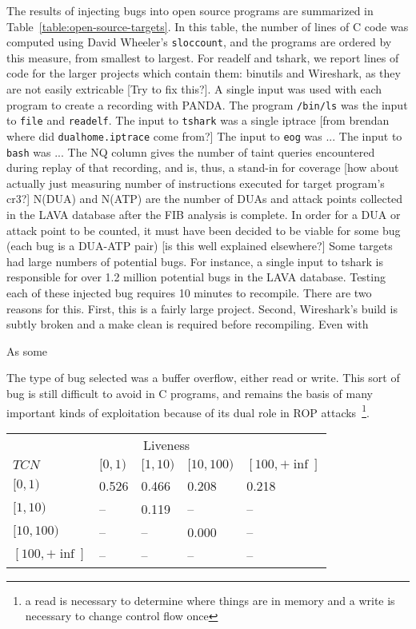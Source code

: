 The results of injecting bugs into open source programs are summarized in Table~\ref{table:open-source-targets}.
In this table, the number of lines of C code was computed using David Wheeler's \verb+sloccount+, and the programs are ordered by this measure, from smallest to largest.
For readelf and tshark, we report lines of code for the larger projects which contain them: binutils and Wireshark, as they are not easily extricable [Try to fix this?].
A single input was used with each program to create a recording with PANDA.
The program \verb+/bin/ls+ was the input to \verb+file+ and \verb+readelf+.
The input to \verb+tshark+ was a single iptrace [from brendan where did \verb+dualhome.iptrace+ come from?] 
The input to \verb+eog+ was ...
The input to \verb+bash+ was ...
The NQ column gives the number of taint queries encountered during replay of that recording, and is, thus, a stand-in for coverage [how about actually just measuring number of instructions executed for target program's cr3?]
N(DUA) and N(ATP) are the number of DUAs and attack points collected in the LAVA database after the FIB analysis is complete.
In order for a DUA or attack point to be counted, it must have been decided to be viable for some bug (each bug is a DUA-ATP pair) [is this well explained elsewhere?]
Some targets had large numbers of potential bugs. 
For instance, a single input to tshark is responsible for over 1.2 million potential bugs in the LAVA database. 
Testing each of these injected bug requires 10 minutes to recompile.  
There are two reasons for this.
First, this is a fairly large project.  
Second, Wireshark's build is subtly broken and a make clean is required before recompiling.  
Even with 


As some 

The type of bug selected was a buffer overflow, either read or write.
This sort of bug is still difficult to avoid in C programs, and remains the basis of many important kinds of exploitation because of its dual role in ROP attacks~\footnote{a read is necessary to determine where things are in memory and a write is necessary to change control flow once}.


\begin{table}
\centering
\begin{tabular}{l|l|l|l|l} 
 & \multicolumn{3}{c}{Liveness} &  \\  
$TCN$ &         $[0,1)$ & $[1,10)$ & $[10,100)$ & $[100,+\inf]$ \\  \hline 
$[0,1)$ &       0.526   & 0.466    & 0.208      & 0.218 \\
$[1,10)$ &      --      & 0.119    & --         & --    \\
$[10,100)$ &    --      & --       & 0.000      & --    \\
$[100,+\inf]$ & --      & --       & --         & -- \\ 
\end{tabular}
\end{table}
